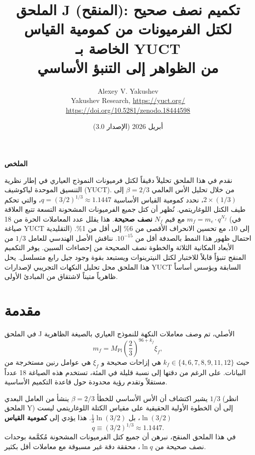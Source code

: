 \documentclass[12pt,a4paper]{article}
\title{\textbf{الملحق J (المنقح): تكميم نصف صحيح لكتل الفرميونات من كمومية القياس الخاصة بـ YUCT}\\
	\vspace{0.5cm}
	\large من الظواهر إلى التنبؤ الأساسي}
\author{Alexey V. Yakushev\\
	\vspace{0.5cm}
	Yakushev Research, \url{https://yuct.org/}\\
	\url{https://doi.org/10.5281/zenodo.18444598}}
\date{أبريل 2026 (الإصدار 3.0)}
\begin{document}
	
	\maketitle
	\vspace{0.5cm}
	\noindent\textbf{الملخص}
	
	\noindent
	نقدم في هذا الملحق تحليلاً دقيقاً لكتل فرميونات النموذج العياري في إطار نظرية التنسيق الموحدة لياكوشيف (YUCT). من خلال تحليل الأس العالمي \(\beta = 2/3\) إلى \(2 \times (1/3)\)، نحدد كمومية القياس الأساسية \(q = (3/2)^{1/3} \approx 1.1447\)، والتي تحكم طيف الكتل اللوغاريتمي. نُظهر أن كتل جميع الفرميونات المشحونة التسعة تتبع العلاقة \(m_f = m_e \cdot q^{N_f}\) مع قيم \(N_f\) \textbf{نصف صحيحة}. هذا يقلل عدد المعاملات الحرة من 18 (في صياغة YUCT التقليدية) إلى 10، مع تحسين الانحراف الأقصى من 6\% إلى أقل من 1\%. احتمال ظهور هذا النمط بالصدفة أقل من \(10^{-15}\). نناقش الأصل الهندسي للعامل \(1/3\) من الأبعاد المكانية الثلاثة والخطوة نصف الصحيحة من إحصاءات السبين. يوفر التكميم المنقح تنبؤاً قابلاً للاختبار لكتل النيترينوات ويستبعد بقوة وجود جيل رابع متسلسل. يحل هذا الملحق محل تحليل النكهات التجريبي لإصدارات YUCT السابقة ويؤسس أساساً ظاهرياً متيناً لاشتقاق من المبادئ الأولى.
	
	\vspace{0.5cm}
	\newpage
	
	\section{مقدمة}
	
	في الملحق J الأصلي، تم وصف معاملات النكهة للنموذج العياري بالصيغة الظاهرية
	\begin{equation}
		m_f = M_{\mathrm{Pl}} \left( \frac{2}{3} \right)^{96 + k_f} \xi_f,
		\label{eq:old}
	\end{equation}
	حيث \(k_f \in \{4,6,7,8,9,11,12\}\) هي إزاحات صحيحة و \(\xi_f\) هي عوامل رنين مستخرجة من البيانات. على الرغم من دقتها إلى نسبة قليلة في المئة، تستخدم هذه الصياغة 18 عدداً مستقلاً وتقدم رؤية محدودة حول قاعدة التكميم الأساسية.
	
	يشير اكتشاف أن الأس الأساسي للخطأ \(\beta = 2/3\) ينشأ من العامل البعدي \(1/3\) (انظر الملحق Y) إلى أن الخطوة الأولية الحقيقية على مقياس الكتلة اللوغاريتمي ليست \(\ln(3/2)\)، بل \(\frac{1}{3}\ln(3/2)\). هذا يؤدي إلى \textbf{كمومية القياس}
	\begin{equation}
		q \equiv (3/2)^{1/3} \approx 1.1447.
	\end{equation}
	في هذا الملحق المنقح، نبرهن أن جميع كتل الفرميونات المشحونة مُكمَّمة بوحدات نصف صحيحة من \(\ln q\)، محققة دقة غير مسبوقة مع معاملات أقل بكثير.
	
\end{document}
